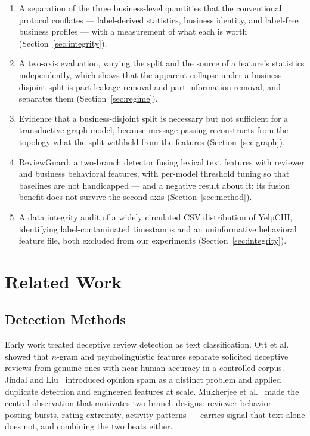 \documentclass[conference]{IEEEtran}
\begin{document}
\begin{enumerate}[leftmargin=*, topsep=2pt, itemsep=2pt, parsep=0pt]
\item A separation of the three business-level quantities that the conventional
      protocol conflates --- label-derived statistics, business identity, and
      label-free business profiles --- with a measurement of what each is worth
      (Section~\ref{sec:integrity}).
\item A two-axis evaluation, varying the split and the source of a feature's
      statistics independently, which shows that the apparent collapse under a
      business-disjoint split is part leakage removal and part information
      removal, and separates them (Section~\ref{sec:regime}).
\item Evidence that a business-disjoint split is necessary but not sufficient
      for a transductive graph model, because message passing reconstructs from
      the topology what the split withheld from the features
      (Section~\ref{sec:graph}).
\item ReviewGuard, a two-branch detector fusing lexical text features with
      reviewer and business behavioral features, with per-model threshold tuning
      so that baselines are not handicapped --- and a negative result about it:
      its fusion benefit does not survive the second axis
      (Section~\ref{sec:method}).
\item A data integrity audit of a widely circulated CSV distribution of
      YelpCHI, identifying label-contaminated timestamps and an uninformative
      behavioral feature file, both excluded from our experiments
      (Section~\ref{sec:integrity}).
\end{enumerate}


\section{Related Work}
\label{sec:related}

\subsection{Detection Methods}

Early work treated deceptive review detection as text classification. Ott et
al.~\cite{ott2011finding} showed that $n$-gram and psycholinguistic features
separate solicited deceptive reviews from genuine ones with near-human accuracy
in a controlled corpus. Jindal and Liu~\cite{jindal2008opinion} introduced
opinion spam as a distinct problem and applied duplicate detection and
engineered features at scale. Mukherjee et al.~\cite{mukherjee2013what} made the
central observation that motivates two-branch designs: reviewer behavior ---
posting bursts, rating extremity, activity patterns --- carries signal that text
alone does not, and combining the two beats either.
\end{document}
